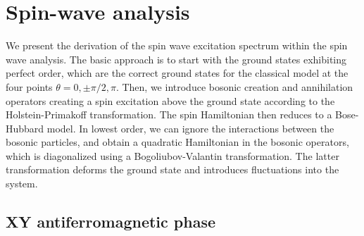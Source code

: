 \chapter{Spin-wave analysis}
\label{spinwave_analysis}

We present the derivation of the spin wave excitation spectrum
within the spin wave analysis. The basic approach is to start with the ground
states exhibiting perfect order, which are the correct ground states for the classical
model at the four points $\theta = 0,\pm \pi/2, \pi$.  Then, we introduce bosonic
creation and annihilation operators creating a spin excitation above the ground
state according to the Holstein-Primakoff transformation. The spin Hamiltonian
then reduces to a Bose-Hubbard model. In lowest order, we can ignore the
interactions between the bosonic particles, and obtain a quadratic Hamiltonian
in the bosonic operators, which is diagonalized using a
Bogoliubov-Valantin transformation.  The latter transformation deforms the
ground state and introduces fluctuations into the system.

\section{XY antiferromagnetic phase}

